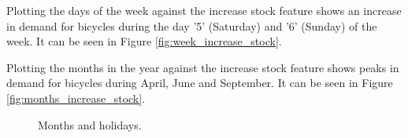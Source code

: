 \documentclass{article}
\begin{document}
\begin{enumerate}
\begin{enumerate}

Plotting the days of the week against the increase stock feature shows an increase in demand for bicycles during the day '5' (Saturday) and '6' (Sunday) of the week. It can be seen in Figure \ref{fig:week_increase_stock}.



Plotting the months in the year against the increase stock feature shows peaks in demand for bicycles during April, June and September. It can be seen in Figure \ref{fig:months_increase_stock}.

\begin{figure}[htb!]
\caption{Months and holidays.}
\label{fig:H}
\hfill
\end{figure}



\end{enumerate}
\end{enumerate}
\end{document}
